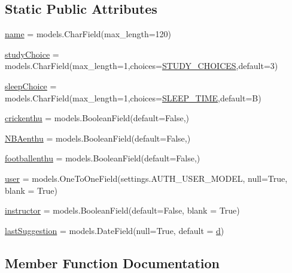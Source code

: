 \subsection*{Static Public Attributes}
\begin{DoxyCompactItemize}
\item 
\hyperlink{classprofiles_1_1models_1_1profile_aa33b7b8c3235c07c5e71c7a58c13c16c}{name} = models.\+Char\+Field(max\+\_\+length=120)
\item 
\hyperlink{classprofiles_1_1models_1_1profile_abeca72fd053b0c5f75b3927194bcd809}{study\+Choice} = models.\+Char\+Field(max\+\_\+length=1,choices=\hyperlink{namespaceprofiles_1_1models_a66a49fea9e1603c3395bc387e385d6e1}{S\+T\+U\+D\+Y\+\_\+\+C\+H\+O\+I\+C\+ES},default=\textquotesingle{}3\textquotesingle{})
\item 
\hyperlink{classprofiles_1_1models_1_1profile_a485c5a9cd3e313b41885211790de2bb5}{sleep\+Choice} = models.\+Char\+Field(max\+\_\+length=1,choices=\hyperlink{namespaceprofiles_1_1models_a7111936f7e1fe09a6a5305105cc13029}{S\+L\+E\+E\+P\+\_\+\+T\+I\+ME},default=\textquotesingle{}B\textquotesingle{})
\item 
\hyperlink{classprofiles_1_1models_1_1profile_a7902853c5b850e9725f3b63a84371e9b}{crickenthu} = models.\+Boolean\+Field(default=False,)
\item 
\hyperlink{classprofiles_1_1models_1_1profile_afc2a9d06cde3a75d3706077e9c1ba28d}{N\+B\+Aenthu} = models.\+Boolean\+Field(default=False,)
\item 
\hyperlink{classprofiles_1_1models_1_1profile_a3f41973c11a84c6e3564972e40e6c257}{footballenthu} = models.\+Boolean\+Field(default=False,)
\item 
\hyperlink{classprofiles_1_1models_1_1profile_a00f2d160ad2e122d55addaa6f43e9aab}{user} = models.\+One\+To\+One\+Field(settings.\+A\+U\+T\+H\+\_\+\+U\+S\+E\+R\+\_\+\+M\+O\+D\+EL, null=True, blank = True)
\item 
\hyperlink{classprofiles_1_1models_1_1profile_acfa71dd56ef725545087a5e16c4591ad}{instructor} = models.\+Boolean\+Field(default=False, blank = True)
\item 
\hyperlink{classprofiles_1_1models_1_1profile_adbe845698f928aed7032f3884ef85a72}{last\+Suggestion} = models.\+Date\+Field(null=True, default = \hyperlink{namespaceprofiles_1_1models_a2ab65a67d2b0414ee05d3702bc47ab17}{d})
\end{DoxyCompactItemize}


\subsection{Member Function Documentation}
